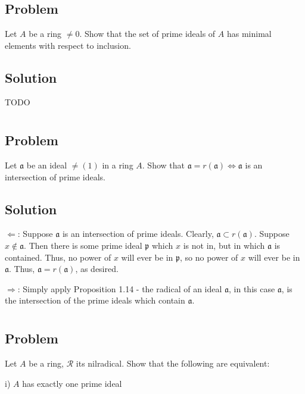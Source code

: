 \documentclass[book,12pt,oneside,openany]{memoir}
\begin{document}
\section{}
\subsection{Problem}
Let $A$ be a ring $\neq 0$. Show that the set of prime ideals of $A$ has minimal elements with respect to inclusion.
\subsection{Solution}
TODO


\section{}
\subsection{Problem}
Let $\mathfrak{a}$ be an ideal $\neq (1)$ in a ring $A$. Show that $\mathfrak{a} = r(\mathfrak{a}) \Leftrightarrow \mathfrak{a}$ is an intersection of prime ideals.
\subsection{Solution}

$\Leftarrow$: Suppose $\mathfrak{a}$ is an intersection of prime ideals. Clearly, $\mathfrak{a} \subset r(\mathfrak{a})$. Suppose $x \notin \mathfrak{a}$. Then there is some prime ideal $\mathfrak{p}$ which $x$ is not in, but in which $\mathfrak{a}$ is contained. Thus, no power of $x$ will ever be in $\mathfrak{p}$, so no power of $x$ will ever be in $\mathfrak{a}$. Thus, $\mathfrak{a} = r(\mathfrak{a})$, as desired.

$\Rightarrow$:  Simply apply Proposition 1.14 - the radical of an ideal $\mathfrak{a}$, in this case $\mathfrak{a}$, is the intersection of the prime ideals which contain $\mathfrak{a}$.
\section{}
\subsection{Problem}
Let $A$ be a ring, $\mathcal{R}$ its nilradical. Show that the following are equivalent:

i) $A$ has exactly one prime ideal
\end{document}
